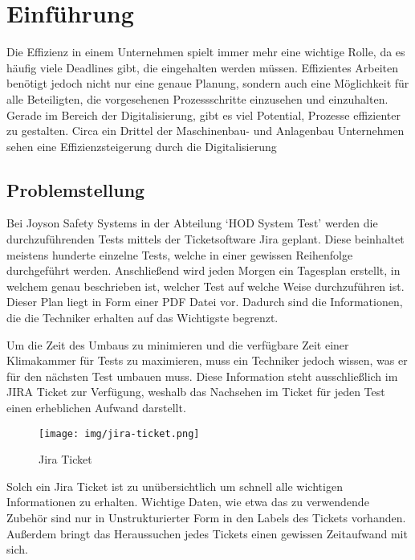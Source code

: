 \section{Einführung}

Die Effizienz in einem Unternehmen spielt immer mehr eine wichtige Rolle, da es häufig viele Deadlines gibt, die 
eingehalten werden müssen. Effizientes Arbeiten benötigt jedoch nicht nur eine genaue Planung, sondern auch eine Möglichkeit für alle Beteiligten,
die vorgesehenen Prozessschritte einzusehen und einzuhalten. Gerade im Bereich der Digitalisierung, gibt es viel Potential, Prozesse 
effizienter zu gestalten. Circa ein Drittel der Maschinenbau- und Anlagenbau Unternehmen sehen eine Effizienzsteigerung durch die 
Digitalisierung~\cite{Bre17}

\subsection{Problemstellung}\label{sec:problems}
Bei Joyson Safety Systems in der Abteilung `\gls{HOD} System Test' werden die 
durchzuführenden Tests mittels der Ticketsoftware Jira geplant. 
Diese beinhaltet meistens hunderte einzelne Tests, welche in einer gewissen
Reihenfolge durchgeführt werden. Anschließend wird jeden Morgen ein Tagesplan 
erstellt, in welchem genau beschrieben ist, welcher Test auf welche Weise 
durchzuführen ist. Dieser Plan liegt in Form einer \gls{PDF} Datei vor. Dadurch sind 
die Informationen, die die \gls{Techniker} erhalten auf das Wichtigste begrenzt. 

Um die Zeit des Umbaus zu minimieren und die verfügbare Zeit einer Klimakammer
für Tests zu maximieren, muss ein \gls{Techniker} jedoch wissen, was er für den 
nächsten Test umbauen muss. Diese Information steht ausschließlich im JIRA 
Ticket zur Verfügung, weshalb das Nachsehen im Ticket für jeden Test einen
erheblichen Aufwand darstellt.

\begin{figure}[H]
    \texttt{[image: img/jira-ticket.png]}
    \caption{Jira Ticket}
\end{figure}

Solch ein Jira Ticket ist zu unübersichtlich um schnell alle wichtigen 
Informationen zu erhalten. Wichtige Daten, wie etwa das zu verwendende Zubehör
sind nur in Unstrukturierter Form in den Labels des Tickets vorhanden. 
Außerdem bringt das Heraussuchen jedes Tickets einen gewissen Zeitaufwand mit sich.\\


